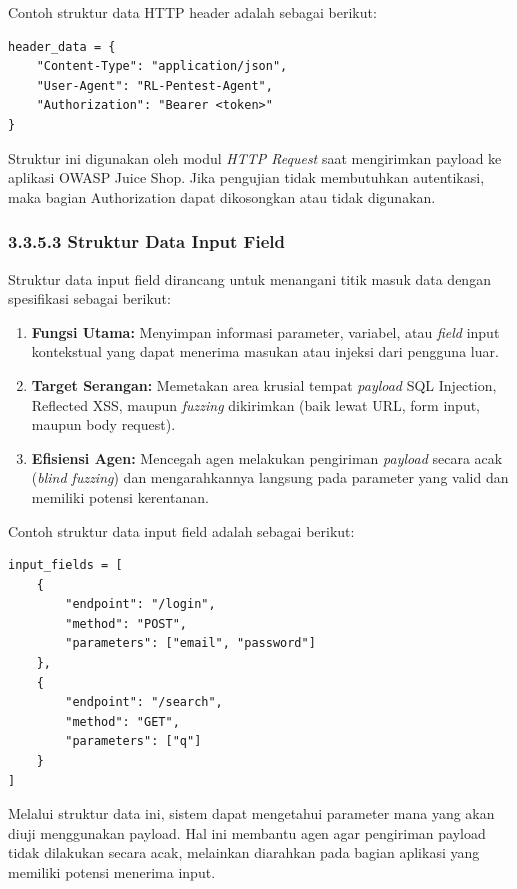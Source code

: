 Contoh struktur data HTTP header adalah sebagai berikut:

\begin{verbatim}
header_data = {
    "Content-Type": "application/json",
    "User-Agent": "RL-Pentest-Agent",
    "Authorization": "Bearer <token>"
}
\end{verbatim}

Struktur ini digunakan oleh modul \textit{HTTP Request} saat mengirimkan payload ke aplikasi OWASP Juice Shop. Jika pengujian tidak membutuhkan autentikasi, maka bagian Authorization dapat dikosongkan atau tidak digunakan.

\subsubsection{3.3.5.3 Struktur Data Input Field}

Struktur data input field dirancang untuk menangani titik masuk data dengan spesifikasi sebagai berikut:

\begin{enumerate}
    \item \textbf{Fungsi Utama:} Menyimpan informasi parameter, variabel, atau \textit{field} input kontekstual yang dapat menerima masukan atau injeksi dari pengguna luar.
    \item \textbf{Target Serangan:} Memetakan area krusial tempat \textit{payload} SQL Injection, Reflected XSS, maupun \textit{fuzzing} dikirimkan (baik lewat URL, form input, maupun body request).
    \item \textbf{Efisiensi Agen:} Mencegah agen melakukan pengiriman \textit{payload} secara acak (\textit{blind fuzzing}) dan mengarahkannya langsung pada parameter yang valid dan memiliki potensi kerentanan.
\end{enumerate}

Contoh struktur data input field adalah sebagai berikut:

\begin{verbatim}
input_fields = [
    {
        "endpoint": "/login",
        "method": "POST",
        "parameters": ["email", "password"]
    },
    {
        "endpoint": "/search",
        "method": "GET",
        "parameters": ["q"]
    }
]
\end{verbatim}

Melalui struktur data ini, sistem dapat mengetahui parameter mana yang akan diuji menggunakan payload. Hal ini membantu agen agar pengiriman payload tidak dilakukan secara acak, melainkan diarahkan pada bagian aplikasi yang memiliki potensi menerima input.

